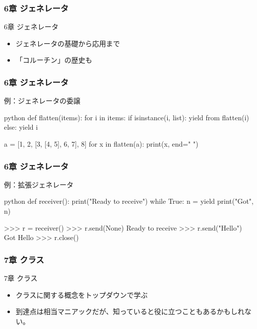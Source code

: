 \documentclass[aspectratio=169,dvipdfmx,12pt,notheorems]{beamer}
\theoremstyle{definition}
\begin{document}
\begin{frame}\frametitle{6章 ジェネレータ}

\begin{block}{6章 ジェネレータ}
\begin{itemize}
\item ジェネレータの基礎から応用まで
\item 「コルーチン」の歴史も
\end{itemize}
\end{block}

\end{frame}

\begin{frame}[fragile]\frametitle{6章 ジェネレータ}

\begin{exampleblock}{例：ジェネレータの委譲}
\begin{pygments}{python}    
def flatten(items):
    for i in items:
        if isinstance(i, list):
            yield from flatten(i)
        else:
            yield i

a = [1, 2, [3, [4, 5], 6, 7], 8]
for x in flatten(a):
    print(x, end=" ")
\end{pygments}
\end{exampleblock}

\end{frame}

\begin{frame}[fragile]\frametitle{6章 ジェネレータ}

\begin{exampleblock}{例：拡張ジェネレータ}
\begin{pygments}{python}    
def receiver():
    print("Ready to receive")
    while True:
        n = yield
        print("Got", n)

>>> r = receiver()
>>> r.send(None)
Ready to receive
>>> r.send("Hello")
Got Hello
>>> r.close()
\end{pygments}
\end{exampleblock}

\end{frame}

\begin{frame}\frametitle{7章 クラス}

\begin{block}{7章 クラス}
\begin{itemize}
\item クラスに関する概念をトップダウンで学ぶ
\item 到達点は相当マニアックだが、知っていると役に立つこともあるかもしれない。
\end{itemize}
\end{block}

\end{frame}
\end{document}
